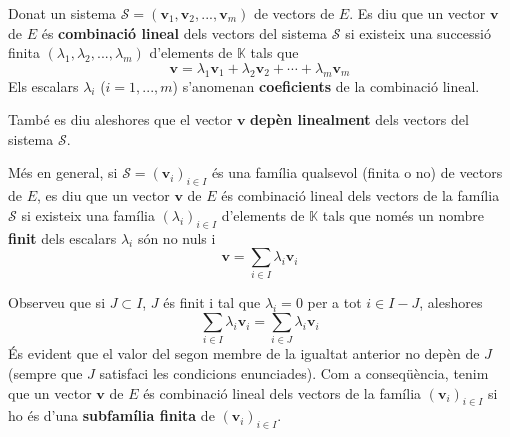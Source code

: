 \begin{definicio}
Donat un sistema $\mathcal{S}=(\mathbf{v}_{1},\mathbf{v}_{2},...,\mathbf{v}%
_{m})$ de vectors de $E$. Es diu que un vector $\mathbf{v}$ de $%
E$ és \textbf{combinació lineal} dels vectors del sistema $%
\mathcal{S}$ si existeix una successió finita $(\lambda _{1},\lambda
_{2},...,\lambda _{m})$ d’elements de $\mathbb{K}$ tals que%
\begin{equation*}
\mathbf{v}=\lambda _{1}\mathbf{v}_{1}+\lambda _{2}\mathbf{v}_{2}+\cdots
+\lambda _{m}\mathbf{v}_{m}
\end{equation*}%
Els escalars $\lambda _{i}$ ($i=1,...,m$) s’anomenan \textbf{coeficients}
de la combinació lineal.

També es diu aleshores que el vector $\mathbf{v}$ \textbf{depèn
linealment} dels vectors del sistema $\mathcal{S}$.

\end{definicio}
\begin{observacio}
Més en general, si $\mathcal{S}=(\mathbf{v}_{i})_{i\in I}$ és una
família qualsevol (finita o no) de vectors de $E$, es diu que un
vector $\mathbf{v}$ de $E$ és combinació lineal dels
vectors de la família $\mathcal{S}$ si existeix una família $(\lambda
_{i})_{i\in I}$ d’elements de $\mathbb{K}$ tals que només un nombre \textbf{finit} dels escalars $\lambda _{i}$ són no nuls i 
\begin{equation*}
\mathbf{v}=\sum_{i\in I}\lambda _{i}\mathbf{v}_{i}
\end{equation*}

Observeu que si $J\subset I$, $J$ és finit i tal que $\lambda _{i}=0$
per a tot $i\in I-J$, aleshores%
\begin{equation*}
\sum_{i\in I}\lambda _{i}\mathbf{v}_{i}=\sum_{i\in J}\lambda _{i}\mathbf{v}%
_{i}
\end{equation*}%
És evident que el valor del segon membre de la igualtat anterior no
depèn de $J$ (sempre que $J$ satisfaci les condicions enunciades). Com a
conseqüència, tenim que un vector $\mathbf{v}$ de $E$ és combinació lineal dels vectors de la família $(\mathbf{v}_{i})_{i\in I}$ si
ho és d’una \textbf{subfamília finita} de $(\mathbf{v}_{i})_{i\in I}$.
\end{observacio}

